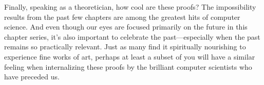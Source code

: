 Finally, speaking as a theoretician, how cool are these proofs? The impossibility results
from the past few chapters are among the greatest hits of computer science. And even
though our eyes are focused primarily on the future in this chapter series, it’s also important
to celebrate the past—especially when the past remains so practically relevant. Just as many
find it spiritually nourishing to experience fine works of art, perhaps at least a subset of you
will have a similar feeling when internalizing these proofs by the brilliant computer scientists
who have preceded us.















